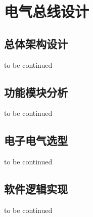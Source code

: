 \newpage

\section{电气总线设计}

\subsection{总体架构设计}

to be continued

\subsection{功能模块分析}

to be continued

\subsection{电子电气选型}

to be continued

\subsection{软件逻辑实现}

to be continued
